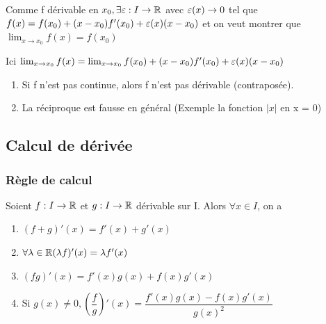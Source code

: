 \documentclass[a4paper, 12pt]{article}
\begin{document}
\begin{demonstration}
    Comme f dérivable en $x_0, \exists \varepsilon: I \rightarrow \mathbb{R}$ avec $\varepsilon(x) \to 0$ %
    tel que $f(x) = f(x_0) + (x - x_0)f'(x_0) + \varepsilon(x)(x-x_0)$
    et on veut montrer que $\lim_{x \to x_0}f(x) = f(x_0)$

    Ici $\lim_{x \to x_0}f(x) = \lim_{x \to x_0}f(x_0)+(x - x_0)f'(x_0) + \varepsilon(x)(x - x_0)$
\end{demonstration}

\begin{remark}
    \begin{enumerate}
        \item Si f n'est pas continue, alors f n'est pas dérivable (contraposée).
        \item La réciproque est fausse en général (Exemple la fonction $|x|$ en x = 0)
    \end{enumerate}
\end{remark}

\subsection{Calcul de dérivée}

\subsubsection{Règle de calcul}

\begin{proprietes}
    Soient $f: I \rightarrow \mathbb{R}$ et $g: I \rightarrow \mathbb{R}$ dérivable sur I.
    Alors $\forall x \in I$, on a
    \begin{enumerate}
        \item $(f + g)'(x) = f'(x) + g'(x)$
        \item $\forall \lambda \in \mathbb{R} (\lambda f)'(x) = \lambda f'(x)$
        \item $(fg)'(x) = f'(x)g(x) + f(x)g'(x)$
        \item Si $g(x) \neq 0, (\dfrac{f}{g})'(x) = \dfrac{f'(x)g(x) - f(x)g'(x)}{g(x)^2}$
    \end{enumerate}
\end{proprietes}
\end{document}
